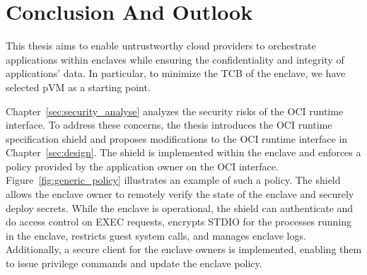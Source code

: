 \chapter{Conclusion And Outlook}
\label{sec:conclusion}





This thesis aims to enable untrustworthy cloud providers to orchestrate applications within enclaves while ensuring the confidentiality and integrity of applications' data. In particular, to minimize the \acrshort{TCB} of the enclave, we have selected \acrshort{pVM} as a starting point.
 
Chapter~\ref{sec:security_analyse} analyzes the security risks of the OCI runtime interface. To address these concerns, the thesis introduces the OCI runtime specification shield and proposes modifications to the OCI runtime interface in Chapter~\ref{sec:design}. The shield is implemented within the enclave and enforces a policy provided by 
the application owner on the OCI interface. Figure~\ref{fig:generic_policy} illustrates an example of such a policy. The shield allows the enclave owner to remotely verify the state of the enclave and securely deploy secrets. While the enclave is operational, the shield can authenticate and do access control on EXEC requests, 
encrypts STDIO for the processes running in the enclave, restricts guest system calls, and manages enclave logs. Additionally, a secure client for the enclave owners is implemented, enabling them to issue privilege commands and update the enclave policy.
 
